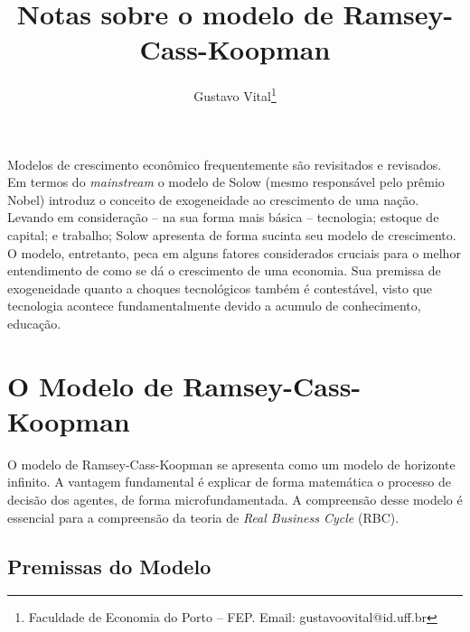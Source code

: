\documentclass[11pt,a4paper]{article}
\author{Gustavo Vital\thanks{Faculdade de Economia do Porto -- FEP. Email: gustavoovital@id.uff.br}}
\title{Notas sobre o modelo de Ramsey-Cass-Koopman}
\begin{document}
\maketitle

Modelos de crescimento econômico frequentemente são revisitados e revisados. Em termos do \textit{mainstream} o modelo de Solow (mesmo responsável pelo prêmio Nobel) introduz o conceito de exogeneidade ao crescimento de uma nação. Levando em consideração -- na sua forma mais básica -- tecnologia; estoque de capital; e trabalho; Solow apresenta de forma sucinta seu modelo de crescimento. O modelo, entretanto, peca em alguns fatores considerados cruciais para o melhor entendimento de como se dá o crescimento de uma economia. Sua premissa de exogeneidade quanto a choques tecnológicos também é contestável, visto que tecnologia acontece fundamentalmente devido a acumulo de conhecimento, educação.

\section{O Modelo de Ramsey-Cass-Koopman}  

O modelo de Ramsey-Cass-Koopman se apresenta como um modelo de horizonte infinito. A vantagem fundamental é explicar de forma matemática o processo de decisão dos agentes, de forma microfundamentada. A compreensão desse modelo é essencial para a compreensão da teoria de \textit{Real Business Cycle} (RBC).

\subsection{Premissas do Modelo}
\end{document}
